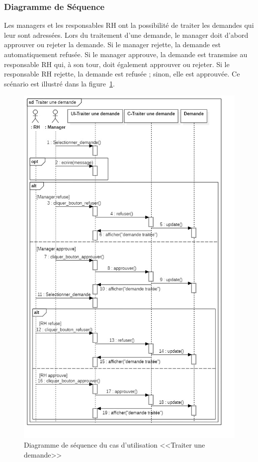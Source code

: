 \subsubsection{Diagramme de Séquence}
Les managers et les responsables RH ont la possibilité de traiter les demandes qui leur sont adressées. Lors du traitement d'une demande, le manager doit d'abord approuver ou rejeter la demande. Si le manager rejette, la demande est automatiquement refusée. Si le manager approuve, la demande est transmise au responsable RH qui, à son tour, doit également approuver ou rejeter. Si le responsable RH rejette, la demande est refusée ; sinon, elle est approuvée. Ce scénario est illustré dans la figure~\ref{fig:Traiter_demande_sequence}.
\clearpage
\begin{figure}[!h]
     \centering
     \includegraphics[width=15cm]{images/S-tdem.jpg}
     \vspace{-0.5cm}
     \caption{Diagramme de séquence du cas d'utilisation <<Traiter une demande>>}
     \label{fig:Traiter_demande_sequence}
\end{figure}
\clearpage
